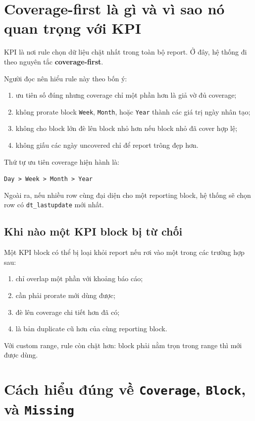 \section{Coverage-first là gì và vì sao nó quan trọng với KPI}

KPI là nơi rule chọn dữ liệu chặt nhất trong toàn bộ report. Ở đây, hệ thống đi theo nguyên tắc \textbf{coverage-first}.

Người đọc nên hiểu rule này theo bốn ý:

\begin{enumerate}[label=-]
\item ưu tiên số đúng nhưng coverage chỉ một phần hơn là giả vờ đủ coverage;
\item không prorate block \texttt{Week}, \texttt{Month}, hoặc \texttt{Year} thành các giá trị ngày nhân tạo;
\item không cho block lớn đè lên block nhỏ hơn nếu block nhỏ đã cover hợp lệ;
\item không giấu các ngày uncovered chỉ để report trông đẹp hơn.
\end{enumerate}

Thứ tự ưu tiên coverage hiện hành là:

\begin{center}
\texttt{Day > Week > Month > Year}
\end{center}

Ngoài ra, nếu nhiều row cùng đại diện cho một reporting block, hệ thống sẽ chọn row có \texttt{dt\_lastupdate} mới nhất.

\subsection{Khi nào một KPI block bị từ chối}

Một KPI block có thể bị loại khỏi report nếu rơi vào một trong các trường hợp sau:

\begin{enumerate}[label=-]
\item chỉ overlap một phần với khoảng báo cáo;
\item cần phải prorate mới dùng được;
\item đè lên coverage chi tiết hơn đã có;
\item là bản duplicate cũ hơn của cùng reporting block.
\end{enumerate}

Với custom range, rule còn chặt hơn: block phải nằm trọn trong range thì mới được dùng.

\section{Cách hiểu đúng về \texttt{Coverage}, \texttt{Block}, và \texttt{Missing}}

